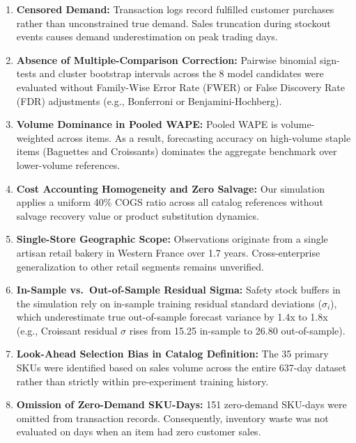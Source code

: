 \documentclass[conference]{IEEEtran}
\begin{document}
\begin{enumerate}
    \item \textbf{Censored Demand:} Transaction logs record fulfilled customer purchases rather than unconstrained true demand. Sales truncation during stockout events causes demand underestimation on peak trading days.
    \item \textbf{Absence of Multiple-Comparison Correction:} Pairwise binomial sign-tests and cluster bootstrap intervals across the 8 model candidates were evaluated without Family-Wise Error Rate (FWER) or False Discovery Rate (FDR) adjustments (e.g., Bonferroni or Benjamini-Hochberg).
    \item \textbf{Volume Dominance in Pooled WAPE:} Pooled WAPE is volume-weighted across items. As a result, forecasting accuracy on high-volume staple items (Baguettes and Croissants) dominates the aggregate benchmark over lower-volume references.
    \item \textbf{Cost Accounting Homogeneity and Zero Salvage:} Our simulation applies a uniform 40\% COGS ratio across all catalog references without salvage recovery value or product substitution dynamics.
    \item \textbf{Single-Store Geographic Scope:} Observations originate from a single artisan retail bakery in Western France over 1.7 years. Cross-enterprise generalization to other retail segments remains unverified.
    \item \textbf{In-Sample vs.\ Out-of-Sample Residual Sigma:} Safety stock buffers in the simulation rely on in-sample training residual standard deviations ($\sigma_i$), which underestimate true out-of-sample forecast variance by 1.4x to 1.8x (e.g., Croissant residual $\sigma$ rises from 15.25 in-sample to 26.80 out-of-sample).
    \item \textbf{Look-Ahead Selection Bias in Catalog Definition:} The 35 primary SKUs were identified based on sales volume across the entire 637-day dataset rather than strictly within pre-experiment training history.
    \item \textbf{Omission of Zero-Demand SKU-Days:} 151 zero-demand SKU-days were omitted from transaction records. Consequently, inventory waste was not evaluated on days when an item had zero customer sales.
\end{enumerate}
\end{document}
